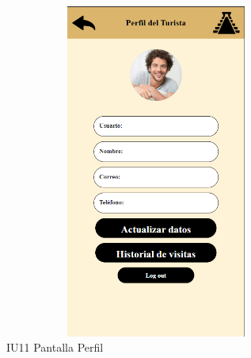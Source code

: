 \begin{figure}[htb]
    \begin{minipage}{1\textwidth}
    \centering
    \includegraphics[width=10cm, height=11cm]{entregable final/pantallasSistema/IU11 Pantalla Perfil.png}
    \caption{IU11 Pantalla Perfil}
\end{minipage}

    

\end{figure}
